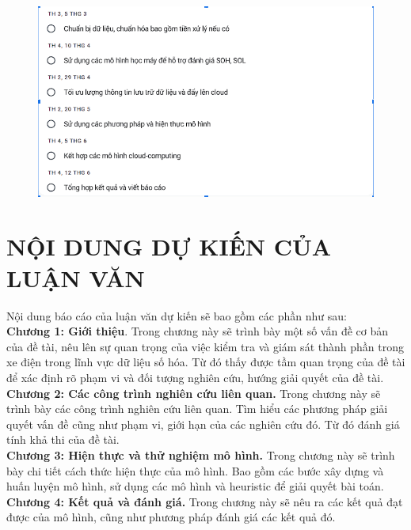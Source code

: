 \documentclass[a4paper,13pt]{article}
\theoremstyle{mytheor}
\begin{document}
\begin{figure}[h]
\begin{center}
\includegraphics[width=5in]{plan.png}
\end{center}
\end{figure} 

\vspace{5cm}
\section{NỘI DUNG DỰ KIẾN CỦA LUẬN VĂN}

Nội dung báo cáo của luận văn dự kiến sẽ bao gồm các phần như sau:\\

\textbf{Chương 1: Giới thiệu}. Trong chương này sẽ trình bày một số vấn đề cơ bản của đề tài, nêu lên sự quan trọng của việc kiểm tra và giám sát thành phần trong xe điện trong lĩnh vực dữ liệu số hóa. Từ đó thấy được tầm quan trọng của đề tài để xác định rõ phạm vi và đối tượng nghiên cứu, hướng giải quyết của đề tài.
\\

\textbf{Chương 2: Các công trình nghiên cứu liên quan.} Trong chương này sẽ trình bày các công trình nghiên cứu liên quan. Tìm hiểu các phương pháp giải quyết vấn đề cũng như phạm vi, giới hạn của các nghiên cứu đó. Từ đó đánh giá tính khả thi của đề tài.\\

\textbf{Chương 3: Hiện thực và thử nghiệm mô hình. } Trong chương này sẽ trình bày chi tiết cách thức hiện thực của mô hình. Bao gồm các bước xây dựng và huấn luyện mô hình, sử dụng các mô hình và heuristic để giải quyết bài toán.\\

\textbf{Chương 4: Kết quả và đánh giá.} Trong chương này sẽ nêu ra các kết quả đạt được của mô hình, cũng như phương pháp đánh giá các kết quả đó.\\
\end{document}
